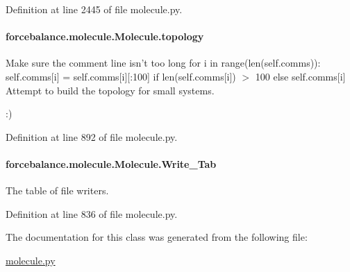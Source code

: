 Definition at line 2445 of file molecule.\-py.

\hypertarget{classforcebalance_1_1molecule_1_1Molecule_a57facdb1b7e71fabfad0df72a7ff94f5}{
\paragraph[{topology}]{\setlength{\rightskip}{0pt plus 5cm}forcebalance.\-molecule.\-Molecule.\-topology}}\label{classforcebalance_1_1molecule_1_1Molecule_a57facdb1b7e71fabfad0df72a7ff94f5}


Make sure the comment line isn't too long for i in range(len(self.\-comms))\-: self.\-comms\mbox{[}i\mbox{]} = self.\-comms\mbox{[}i\mbox{]}\mbox{[}\-:100\mbox{]} if len(self.\-comms\mbox{[}i\mbox{]}) $>$ 100 else self.\-comms\mbox{[}i\mbox{]} Attempt to build the topology for small systems. 

\-:) 

Definition at line 892 of file molecule.\-py.

\hypertarget{classforcebalance_1_1molecule_1_1Molecule_a85310a28c678cb386f9d2b584b24320d}{
\paragraph[{Write\-\_\-\-Tab}]{\setlength{\rightskip}{0pt plus 5cm}forcebalance.\-molecule.\-Molecule.\-Write\-\_\-\-Tab}}\label{classforcebalance_1_1molecule_1_1Molecule_a85310a28c678cb386f9d2b584b24320d}


The table of file writers. 



Definition at line 836 of file molecule.\-py.



The documentation for this class was generated from the following file\-:\begin{DoxyCompactItemize}
\item 
\hyperlink{molecule_8py}{molecule.\-py}\end{DoxyCompactItemize}
